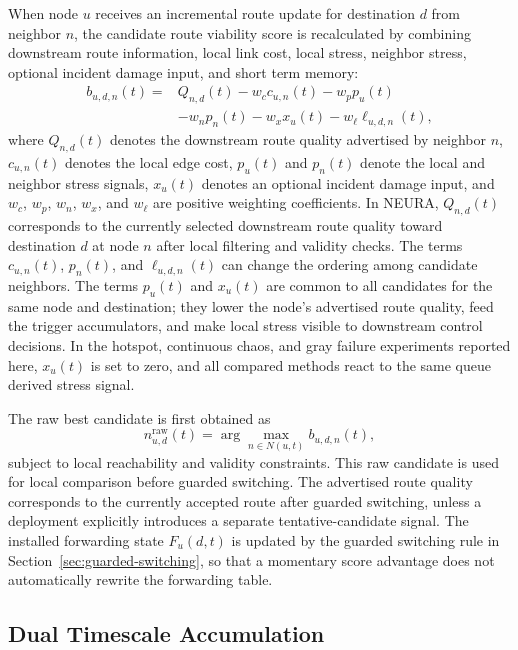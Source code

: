 \documentclass[5p,times]{elsarticle}
\begin{document}
When node $u$ receives an incremental route update for destination $d$ from neighbor $n$, the candidate route viability score is recalculated by combining downstream route information, local link cost, local stress, neighbor stress, optional incident damage input, and short term memory:
\begin{equation}\label{eq:viability}
\begin{aligned}
b_{u,d,n}(t) ={}& Q_{n,d}(t) - w_c c_{u,n}(t) - w_p p_u(t)\\
&- w_n p_n(t) - w_x x_u(t) - w_\ell \ell_{u,d,n}(t),
\end{aligned}
\end{equation}
where $Q_{n,d}(t)$ denotes the downstream route quality advertised by neighbor $n$, $c_{u,n}(t)$ denotes the local edge cost, $p_u(t)$ and $p_n(t)$ denote the local and neighbor stress signals, $x_u(t)$ denotes an optional incident damage input, and $w_c$, $w_p$, $w_n$, $w_x$, and $w_\ell$ are positive weighting coefficients. In NEURA, $Q_{n,d}(t)$ corresponds to the currently selected downstream route quality toward destination $d$ at node $n$ after local filtering and validity checks. The terms $c_{u,n}(t)$, $p_n(t)$, and $\ell_{u,d,n}(t)$ can change the ordering among candidate neighbors. The terms $p_u(t)$ and $x_u(t)$ are common to all candidates for the same node and destination; they lower the node's advertised route quality, feed the trigger accumulators, and make local stress visible to downstream control decisions. In the hotspot, continuous chaos, and gray failure experiments reported here, $x_u(t)$ is set to zero, and all compared methods react to the same queue derived stress signal.

The raw best candidate is first obtained as
\begin{equation}\label{eq:raw-candidate}
n^{\mathrm{raw}}_{u,d}(t) = \arg\max_{n \in N(u,t)} b_{u,d,n}(t),
\end{equation}
subject to local reachability and validity constraints. This raw candidate is used for local comparison before guarded switching. The advertised route quality corresponds to the currently accepted route after guarded switching, unless a deployment explicitly introduces a separate tentative-candidate signal. The installed forwarding state $F_u(d,t)$ is updated by the guarded switching rule in Section~\ref{sec:guarded-switching}, so that a momentary score advantage does not automatically rewrite the forwarding table.

\subsection{Dual Timescale Accumulation}
\end{document}
